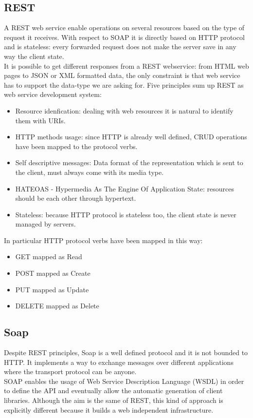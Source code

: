 \subsection{REST}
\label{subsection:REST}
A REST web service enable operations on several resources based on the type of request it receives.
With respect to SOAP it is directly based on HTTP protocol and is stateless: every forwarded request does not make the server save in any way the client state.\\
It is possible to get different responses from a REST webservice: from HTML web pages to JSON or XML formatted data, the only constraint is that web service has to support the data-type we are asking for.
Five principles sum up REST as web service development system:
\begin{itemize}
    \item Resource idenfication: dealing with web resources it is natural to identify them with URIs.
    \item HTTP methods usage: since HTTP is already well defined, CRUD operations have been mapped to the protocol verbs.
    \item Self descriptive messages: Data format of the representation which is sent to the client, must always come with its media type.
    \item HATEOAS - Hypermedia As The Engine Of Application State: resources should be  each other through hypertext.
    \item Stateless: because HTTP protocol is stateless too, the client state is never managed by servers.
\end{itemize}
In particular HTTP protocol verbs have been mapped in this way:
\begin{itemize}
    \item GET mapped as Read
    \item POST mapped as Create
    \item PUT mapped as Update
    \item DELETE mapped as Delete
\end{itemize}
\subsection{Soap}
\label{subsection:Soap}
Despite REST principles, Soap is a well defined protocol and it is not bounded to HTTP. It implements a way to exchange messages over different applications where the transport protocol can be anyone.\\
SOAP enables the usage of Web Service Description Language (WSDL) in order to define the API and eventually allow the automatic generation of client libraries.
Although the aim is the same of REST, this kind of approach is explicitly different because it builds a web independent infrastructure. \cite{soap_vs_rest} 

